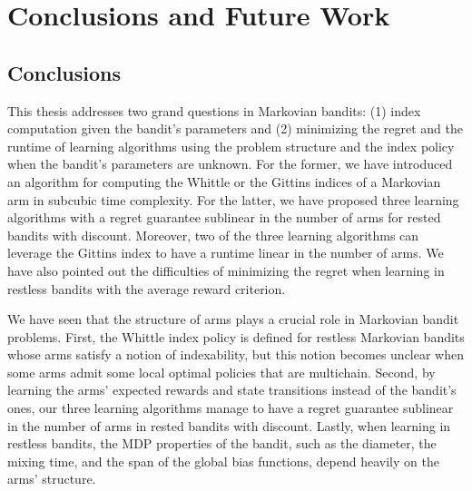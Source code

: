 \begingroup

\let\clearpage\relax

\chapter{Conclusions and Future Work}
\label{chapter:conclusion}

\section{Conclusions}

This thesis addresses two grand questions in Markovian bandits: (1) index computation given the bandit's parameters and (2) minimizing the regret and the runtime of learning algorithms using the problem structure and the index policy when the bandit's parameters are unknown.
For the former, we have introduced an algorithm for computing the Whittle or the Gittins indices of a Markovian arm in subcubic time complexity.
For the latter, we have proposed three learning algorithms with a regret guarantee sublinear in the number of arms for rested bandits with discount.
Moreover, two of the three learning algorithms can leverage the Gittins index to have a runtime linear in the number of arms.
We have also pointed out the difficulties of minimizing the regret when learning in restless bandits with the average reward criterion.

We have seen that the structure of arms plays a crucial role in Markovian bandit problems.
First, the Whittle index policy is defined for restless Markovian bandits whose arms satisfy a notion of indexability, but this notion becomes unclear when some arms admit some local optimal policies that are multichain.
Second, by learning the arms' expected rewards and state transitions instead of the bandit's ones, our three learning algorithms manage to have a regret guarantee sublinear in the number of arms in rested bandits with discount.
Lastly, when learning in restless bandits, the MDP properties of the bandit, such as the diameter, the mixing time, and the span of the global bias functions, depend heavily on the arms' structure.


